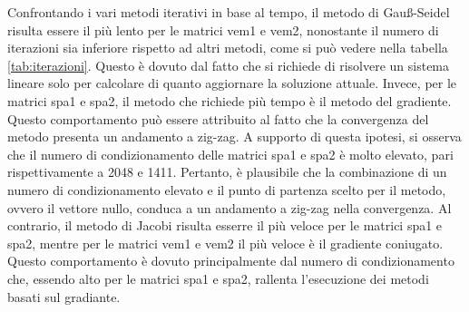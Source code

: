 Confrontando i vari metodi iterativi in base al tempo, il metodo di Gauß-Seidel risulta essere il
più lento per le matrici vem1 e vem2, nonostante il numero di iterazioni sia
inferiore rispetto ad altri metodi, come si può vedere nella tabella \ref{tab:iterazioni}.
Questo è dovuto dal fatto che si richiede di risolvere un sistema lineare solo 
per calcolare di quanto aggiornare la soluzione attuale. 
Invece, per le matrici spa1 e spa2, il metodo che richiede più tempo è il metodo
del gradiente. Questo comportamento può essere attribuito al fatto che la convergenza
del metodo presenta un andamento a zig-zag. A supporto di questa ipotesi, si
osserva che il numero di condizionamento delle matrici spa1 e spa2 è molto elevato,
pari rispettivamente a 2048 e 1411. Pertanto, è plausibile che la combinazione
di un numero di condizionamento elevato e il punto di partenza scelto per il
metodo, ovvero il vettore nullo, conduca a un andamento a zig-zag nella convergenza.
Al contrario, il metodo di Jacobi risulta esserre il più veloce per le matrici spa1
e spa2, mentre per le matrici vem1 e vem2 il più veloce è il gradiente coniugato.
Questo comportamento è dovuto principalmente dal numero di condizionamento che,
essendo alto per le matrici spa1 e spa2, rallenta l'esecuzione dei metodi basati 
sul gradiante. 

